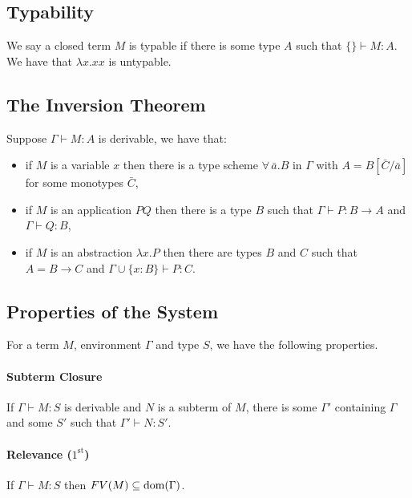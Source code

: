 \subsection{Typability}

We say a closed term $M$ is typable if there is some type $A$ such that
$\{\} \vdash M : A$. We have that $\lambda x.xx$ is untypable.

\subsection{The Inversion Theorem}

Suppose $\Gamma \vdash M : A$ is derivable, we have that: \begin{itemize}
    \item if $M$ is a variable $x$ then there is a type scheme
        $\forall \, \bar{a}.B$ in $\Gamma$ with $A = B[\bar{C}/\bar{a}]$ 
        for some monotypes $\bar{C}$,
    \item if $M$ is an application $PQ$ then there is a type $B$ such
        that $\Gamma \vdash P : B \to A$ and $\Gamma \vdash Q : B$,
    \item if $M$ is an abstraction $\lambda x.P$ then there are types
        $B$ and $C$ such that $A = B \to C$ and 
        $\Gamma \cup \{x : B\} \vdash P : C$.
\end{itemize}

\subsection{Properties of the System}

For a term $M$, environment $\Gamma$ and type $S$, we
have the following properties.

\paragraph{Subterm Closure}
\leavevmode\newline
If $\Gamma \vdash M : S$ is derivable and $N$ is a subterm
of $M$, there is some $\Gamma'$ containing $\Gamma$ and
some $S'$ such that $\Gamma' \vdash N : S'$. 

\paragraph{Relevance ($1^{\text{st}}$)}
\leavevmode\newline
If $\Gamma \vdash M : S$ then $FV(M) \subseteq \operatorname{dom}(\Gamma)$.

